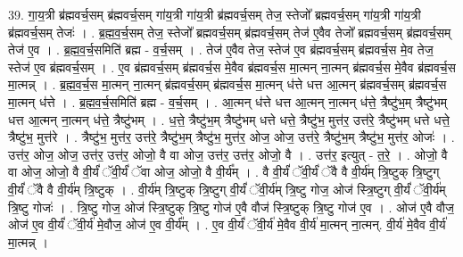 \documentclass[17pt]{extarticle}
\begin{document}
39. गा॒य॒त्री ब्र॑ह्मवर्च॒सम् ब्र॑ह्मवर्च॒सम् गा॑य॒त्री गा॑य॒त्री ब्र॑ह्मवर्च॒सम् तेज॒ स्तेजो᳚ ब्रह्मवर्च॒सम् गा॑य॒त्री गा॑य॒त्री ब्र॑ह्मवर्च॒सम् तेजः॑ । . ब्र॒ह्म॒व॒र्च॒सम् तेज॒ स्तेजो᳚ ब्रह्मवर्च॒सम् ब्र॑ह्मवर्च॒सम् तेज॑ ए॒वैव तेजो᳚ ब्रह्मवर्च॒सम् ब्र॑ह्मवर्च॒सम् तेज॑ ए॒व । . ब्र॒ह्म॒व॒र्च॒समिति॑ ब्रह्म - व॒र्च॒सम् । . तेज॑ ए॒वैव तेज॒ स्तेज॑ ए॒व ब्र॑ह्मवर्च॒सम् ब्र॑ह्मवर्च॒स मे॒व तेज॒ स्तेज॑ ए॒व ब्र॑ह्मवर्च॒सम् । . ए॒व ब्र॑ह्मवर्च॒सम् ब्र॑ह्मवर्च॒स मे॒वैव ब्र॑ह्मवर्च॒स मा॒त्मन् ना॒त्मन् ब्र॑ह्मवर्च॒स मे॒वैव ब्र॑ह्मवर्च॒स मा॒त्मन्न् । . ब्र॒ह्म॒व॒र्च॒स मा॒त्मन् ना॒त्मन् ब्र॑ह्मवर्च॒सम् ब्र॑ह्मवर्च॒स मा॒त्मन् ध॑त्ते धत्त आ॒त्मन् ब्र॑ह्मवर्च॒सम् ब्र॑ह्मवर्च॒स मा॒त्मन् ध॑त्ते । . ब्र॒ह्म॒व॒र्च॒समिति॑ ब्रह्म - व॒र्च॒सम् । . आ॒त्मन् ध॑त्ते धत्त आ॒त्मन् ना॒त्मन् ध॑त्ते॒ त्रैष्टु॑भ॒म् त्रैष्टु॑भम् धत्त आ॒त्मन् ना॒त्मन् ध॑त्ते॒ त्रैष्टु॑भम् । . ध॒त्ते॒ त्रैष्टु॑भ॒म् त्रैष्टु॑भम् धत्ते धत्ते॒ त्रैष्टु॑भ॒ मुत्त॑र॒ उत्त॑रे॒ त्रैष्टु॑भम् धत्ते धत्ते॒ त्रैष्टु॑भ॒ मुत्त॑रे । . त्रैष्टु॑भ॒ मुत्त॑र॒ उत्त॑रे॒ त्रैष्टु॑भ॒म् त्रैष्टु॑भ॒ मुत्त॑र॒ ओज॒ ओज॒ उत्त॑रे॒ त्रैष्टु॑भ॒म् त्रैष्टु॑भ॒ मुत्त॑र॒ ओजः॑ । . उत्त॑र॒ ओज॒ ओज॒ उत्त॑र॒ उत्त॑र॒ ओजो॒ वै वा ओज॒ उत्त॑र॒ उत्त॑र॒ ओजो॒ वै । . उत्त॑र॒ इत्युत् - त॒रे॒ । . ओजो॒ वै वा ओज॒ ओजो॒ वै वी॒र्यं॑ ॅवी॒र्यं॑ ॅवा ओज॒ ओजो॒ वै वी॒र्य᳚म् । . वै वी॒र्यं॑ ॅवी॒र्यं॑ ॅवै वै वी॒र्य॑म् त्रि॒ष्टुक् त्रि॒ष्टुग् वी॒र्यं॑ ॅवै वै वी॒र्य॑म् त्रि॒ष्टुक् । . वी॒र्य॑म् त्रि॒ष्टुक् त्रि॒ष्टुग् वी॒र्यं॑ ॅवी॒र्य॑म् त्रि॒ष्टु गोज॒ ओज॑ स्त्रि॒ष्टुग् वी॒र्यं॑ ॅवी॒र्य॑म् त्रि॒ष्टु गोजः॑ । . त्रि॒ष्टु गोज॒ ओज॑ स्त्रि॒ष्टुक् त्रि॒ष्टु गोज॑ ए॒वै वौज॑ स्त्रि॒ष्टुक् त्रि॒ष्टु गोज॑ ए॒व । . ओज॑ ए॒वै वौज॒ ओज॑ ए॒व वी॒र्यं॑ ॅवी॒र्य॑ मे॒वौज॒ ओज॑ ए॒व वी॒र्य᳚म् । . ए॒व वी॒र्यं॑ ॅवी॒र्य॑ मे॒वैव वी॒र्य॑ मा॒त्मन् ना॒त्मन्. वी॒र्य॑ मे॒वैव वी॒र्य॑ मा॒त्मन्न् । \newline
\end{document}
